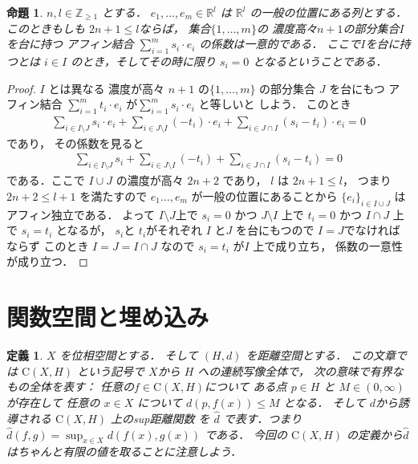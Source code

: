 \documentclass[leqno, a4paper, 12pt]{jsarticle}
\newtheorem{prop}[thm]{命題}
\newtheorem{df}[thm]{定義}
\newcommand{\zz}{\mathbb{Z}}
\newcommand{\rr}{\mathbb{R}}
\newcommand{\yosupmet}[1]{\widehat{#1}}
\newcommand{\yofuncsp}[2]{\mathrm{C}(#1, #2)}
\numberwithin{equation}{section}
\begin{document}
\begin{prop}\label{prop:n+1inde}
$n, l\in \zz_{\ge 1}$
とする．
$e_{1}, \dots, e_{m}\in \rr^{l}$
は
$\rr^{l}$
の一般の位置にある列とする．
このときもしも
$2n+1\le l$ならば，
集合$\{1, \dots, m\}$の
濃度高々$n+1$の部分集合$I$
を台に持つ
アフィン結合
$\sum_{i=1}^{m}s_{i}\cdot e_{i}$
の係数は一意的である．
ここで$I$を台に持つとは
$i\in I$
のとき，そしてその時に限り
$s_{i}=0$
となるということである．
\end{prop}
\begin{proof}
$I$
とは異なる
濃度が高々
$n+1$
の$\{1, \dots, m\}$
の部分集合
$J$
を台にもつ
アフィン結合
$\sum_{i=1}^{m}t_{i}\cdot e_{i}$
が$\sum_{i=1}^{m}s_{i}\cdot e_{i}$
と等しいと
しよう．
このとき
\begin{align}
\sum_{i\in I\setminus J}s_{i}\cdot e_{i}
+
\sum_{i\in J\setminus I}(-t_{i})\cdot e_{i}
+
\sum_{i\in J\cap I}(s_{i}-t_{i})\cdot e_{i}
=0
\end{align}
であり，
その係数を見ると
\begin{align}
\sum_{i\in I\setminus J}s_{i}
+
\sum_{i\in J\setminus I}(-t_{i})
+
\sum_{i\in J\cap I}(s_{i}-t_{i})
=0
\end{align}
である．ここで
$I\cup J$
の濃度が高々
$2n+2$
であり，
$l$
は
$2n+1\le l$，
つまり
$2n+2\le l+1$
を満たすので
$e_{1}\dots, e_{m}$
が一般の位置にあることから
$\{e_{i}\}_{i\in I\cup J}$
はアフィン独立である．
よって
$I\setminus J$上で
$s_{i}=0$
かつ
$J\setminus I$
上で
$t_{i}=0$
かつ
$I\cap J$
上で
$s_{i}=t_{i}$
となるが，
$s_{i}$と
$t_{i}$がそれぞれ
$I$
と$J$
を台にもつので
$I=J$でなければならず
このとき
$I=J=I\cap J$
なので
$s_{i}=t_{i}$
が$I$
上で成り立ち，
係数の一意性が成り立つ．
\end{proof}


\section{関数空間と埋め込み}
\begin{df}
$X$
を位相空間とする．
そして
$(H,  d)$
を距離空間とする．
この文章では
$\yofuncsp{X}{H}$
という記号で
$X$から
$H$
への連続写像全体で，
次の意味で有界なもの全体を表す：
任意の$f\in \yofuncsp{X}{H}$について
ある点
$p\in H$
と
$M\in (0, \infty)$が存在して
任意の
$x\in X$
について
$d(p, f(x))\le M$
となる．
そして
$d$から誘導される
$\yofuncsp{X}{H}$
上のsup距離関数
を
$\yosupmet{d}$
で表す．つまり
$\yosupmet{d}(f, g)=\sup_{x\in X}d(f(x), g(x))$
である．
今回の
$\yofuncsp{X}{H}$
の定義から$\yosupmet{d}$
はちゃんと有限の値を取ることに注意しよう．
\end{df}
\end{document}

